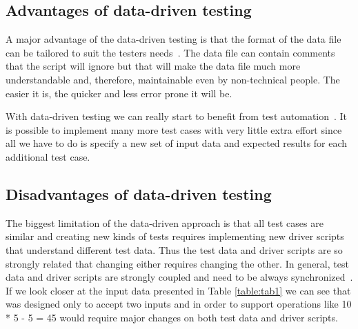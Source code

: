 \subsection{Advantages of data-driven testing}

A major advantage of the data-driven testing is that the format of the
data file can be tailored to suit the testers needs~\cite{Fewster99}. The data
file can contain comments that the script will ignore but that will make the
data file much more understandable and, therefore, maintainable even by
non-technical people. The easier it is, the quicker and less error prone it
will be.

With data-driven testing we can really start to benefit from test automation~\cite{Fewster99}.
It is possible to implement many more test cases with very little extra effort
since all we have to do is specify a new set of input data and expected results
for each additional test case.\\[1mm]



\subsection{Disadvantages of data-driven testing}

The biggest limitation of the data-driven approach is that all test cases are
similar and creating new kinds of tests requires implementing new driver scripts
that understand different test data. Thus the test data and driver scripts are
so strongly related that changing either requires changing the other. In general,
test data and driver scripts are strongly coupled and need to be always
synchronized~\cite{Fewster99}. If we look closer at the input data presented in
Table \ref{table:tab1} we can see that was designed only to accept two inputs
and in order to support operations like 10 * 5 - 5 = 45 would require major
changes on both test data and driver scripts.

